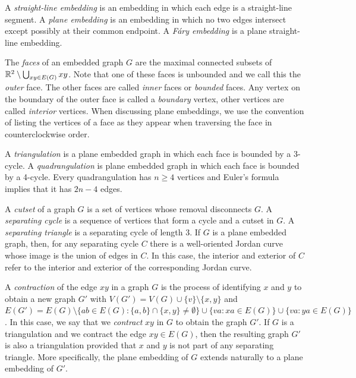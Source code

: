 \documentclass{patmorin}
\begin{document}
A \emph{straight-line embedding} is an embedding in which each edge is
a straight-line segment.  A \emph{plane embedding} is an embedding in
which no two edges intersect except possibly at their common endpoint.
A \emph{Fáry embedding} is a plane straight-line embedding.

The \emph{faces} of an embedded graph $G$ are the maximal connected
subsets of $\mathbb{R}^2\setminus\bigcup_{xy\in E(G)} xy$.  Note that one of
these faces is unbounded and we call this the \emph{outer} face. The
other faces are called \emph{inner} faces or \emph{bounded} faces.
Any vertex on the boundary of the outer face is called a \emph{boundary} vertex, other vertices are called \emph{interior} vertices.
When discussing plane embeddings, we use the convention of listing
the vertices of a face as they appear when traversing the face in
counterclockwise order.

A \emph{triangulation} is a plane embedded graph in which each face is
bounded by a 3-cycle.  A \emph{quadrangulation} is plane embedded graph
in which each face is bounded by a 4-cycle. Every quadrangulation has
$n\ge 4$ vertices and Euler's formula implies that it has $2n-4$ edges.

A \emph{cutset} of a graph $G$ is a set of vertices whose removal
disconnects $G$.  A \emph{separating cycle} is a sequence of vertices
that form a cycle and a cutset in $G$.  A \emph{separating triangle} is
a separating cycle of length 3.  If $G$ is a plane embedded graph, then,
for any separating cycle $C$ there is a well-oriented Jordan curve whose image
is the union of edges in $C$.  In this case, the interior and exterior of
$C$ refer to the interior and exterior of the corresponding Jordan curve.

A \emph{contraction} of the edge $xy$ in a graph $G$ is the
process of identifying $x$ and $y$ to obtain a new graph $G'$ with
$V(G')=V(G)\cup\{v\}\setminus\{x,y\}$ and $E(G')=E(G)\setminus\{ab\in
E(G): \{a,b\}\cap\{x,y\}\neq\emptyset\}\cup\{va: xa\in E(G)\}\cup
\{va:ya\in E(G)\}$.  In this case, we say that we \emph{contract} $xy$
in $G$ to obtain the graph $G'$.  If $G$ is a triangulation and we
contract the edge $xy\in E(G)$, then the resulting graph $G'$ is also
a triangulation provided that $x$ and $y$ is not part of any separating
triangle. More specifically, the plane embedding of $G$ extends naturally
to a plane embedding of $G'$.
\end{document}
